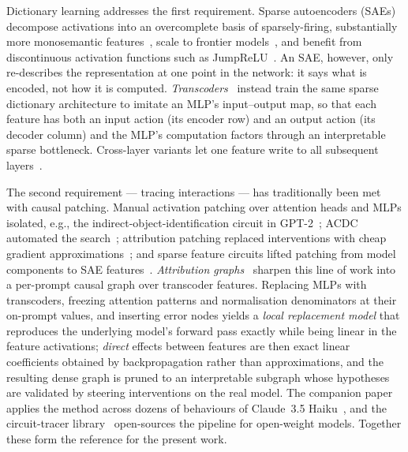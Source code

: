 \documentclass[11pt,a4paper]{article}
\begin{document}
Dictionary learning addresses the first requirement. Sparse autoencoders (SAEs)
decompose activations into an overcomplete basis of sparsely-firing, substantially more
monosemantic features~\citep{bricken2023monosemanticity,cunningham2024sparse}, scale to
frontier models~\citep{templeton2024scaling}, and benefit from discontinuous activation
functions such as JumpReLU~\citep{rajamanoharan2024jumprelu}. An SAE, however, only
re-describes the representation at one point in the network: it says what is encoded,
not how it is computed. \emph{Transcoders}~\citep{dunefsky2024transcoders} instead
train the same sparse dictionary architecture to imitate an MLP's input--output map, so
that each feature has both an input action (its encoder row) and an output action (its
decoder column) and the MLP's computation factors through an interpretable sparse
bottleneck. Cross-layer variants let one feature write to all subsequent
layers~\citep{ameisen2025circuit}.

The second requirement --- tracing interactions --- has traditionally been met with
causal patching. Manual activation patching over attention heads and MLPs isolated,
e.g., the indirect-object-identification circuit in GPT-2~\citep{wang2023ioi};
ACDC automated the search~\citep{conmy2023acdc}; attribution patching replaced
interventions with cheap gradient approximations~\citep{syed2024attribution}; and
sparse feature circuits lifted patching from model components to SAE
features~\citep{marks2025sparse}. \emph{Attribution
graphs}~\citep{ameisen2025circuit} sharpen this line of work into a per-prompt causal
graph over transcoder features. Replacing MLPs with transcoders, freezing attention
patterns and normalisation denominators at their on-prompt values, and inserting error
nodes yields a \emph{local replacement model} that reproduces the underlying model's
forward pass exactly while being linear in the feature activations; \emph{direct}
effects between features are then exact linear coefficients obtained by
backpropagation rather than approximations, and the resulting dense graph is pruned to
an interpretable subgraph whose hypotheses are validated by steering interventions on
the real model. The companion paper applies the method across dozens of behaviours of
Claude~3.5 Haiku~\citep{lindsey2025biology}, and the circuit-tracer
library~\citep{hanna2025circuittracer} open-sources the pipeline for open-weight
models. Together these form the reference for the present work.
\end{document}
